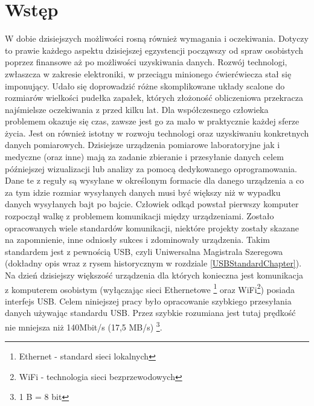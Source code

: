 \documentclass{BscUS}
\begin{document}
\chapter{Wstęp}
\label{beginChapter}
\pagestyle{fancy}
W dobie dzisiejszych możliwości rosną również wymagania i oczekiwania. Dotyczy to prawie każdego aspektu dzisiejszej egzystencji począwszy od spraw osobistych poprzez finansowe aż po możliwości uzyskiwania danych. Rozwój technologi, zwłaszcza w zakresie elektroniki, w przeciągu minionego ćwierćwiecza stał się imponujący. Udało się doprowadzić różne skomplikowane układy scalone do rozmiarów wielkości pudełka zapałek, których złożoność obliczeniowa przekracza najśmielsze oczekiwania z przed kilku lat. Dla współczesnego człowieka problemem okazuje się czas, zawsze jest go za mało w praktycznie każdej sferze życia. Jest on również istotny w rozwoju technologi oraz uzyskiwaniu konkretnych danych pomiarowych.
\newline
\indent Dzisiejsze urządzenia pomiarowe laboratoryjne jak i medyczne (oraz inne) mają za zadanie zbieranie i przesyłanie danych celem późniejszej wizualizacji lub analizy za pomocą dedykowanego oprogramowania. Dane te z reguły są wysyłane w określonym formacie dla danego urządzenia a co za tym idzie rozmiar wysyłanych danych musi być większy niż w wypadku danych wysyłanych bajt po bajcie.
\newline
\indent Człowiek odkąd powstał pierwszy komputer rozpoczął walkę z problemem komunikacji między urządzeniami. Zostało opracowanych wiele standardów komunikacji, niektóre projekty zostały skazane na zapomnienie, inne odniosły sukces i zdominowały urządzenia. Takim standardem jest z pewnością USB, czyli Uniwersalna Magistrala Szeregowa (dokładny opis wraz z rysem historycznym w rozdziale \ref{USBStandardChapter}). Na dzień dzisiejszy większość urządzenia dla których konieczna jest komunikacja z komputerem osobistym (wyłączając sieci Ethernetowe \footnote{Ethernet - standard sieci lokalnych} oraz WiFi\footnote{WiFi - technologia sieci bezprzewodowych}) posiada interfejs USB.
\newline
\indent Celem niniejszej pracy było opracowanie szybkiego przesyłania danych używając standardu USB. Przez szybkie rozumiana jest tutaj prędkość nie mniejsza niż 140Mbit/s (17,5 MB/s) \footnote{1 B = 8 bit}.
\newline
\end{document}
